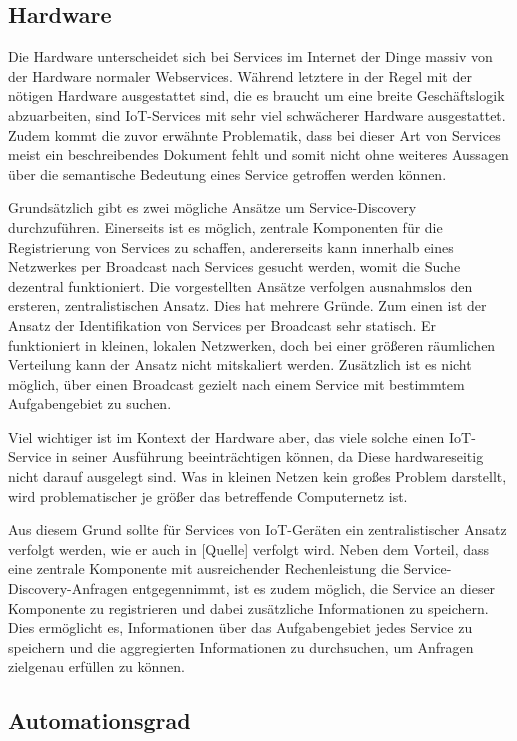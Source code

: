 \documentclass[conference,compsoc]{IEEEtran}
\begin{document}
\subsection{Hardware} \label{Hardware}

Die Hardware unterscheidet sich bei Services im Internet der Dinge massiv von der Hardware normaler Webservices. Während letztere in der Regel mit der nötigen Hardware ausgestattet sind, die es braucht um eine breite Geschäftslogik abzuarbeiten, sind IoT-Services mit sehr viel schwächerer Hardware ausgestattet. Zudem kommt die zuvor erwähnte Problematik, dass bei dieser Art von Services meist ein beschreibendes Dokument fehlt und somit nicht ohne weiteres Aussagen über die semantische Bedeutung eines Service getroffen werden können.

Grundsätzlich gibt es zwei mögliche Ansätze um Service-Discovery durchzuführen. Einerseits ist es möglich, zentrale Komponenten für die Registrierung von Services zu schaffen, andererseits kann innerhalb eines Netzwerkes per Broadcast nach Services gesucht werden, womit die Suche dezentral funktioniert. Die vorgestellten Ansätze verfolgen ausnahmslos den ersteren, zentralistischen Ansatz. Dies hat mehrere Gründe. Zum einen ist der Ansatz der Identifikation von Services per Broadcast sehr statisch. Er funktioniert in kleinen, lokalen Netzwerken, doch bei einer größeren räumlichen Verteilung kann der Ansatz nicht mitskaliert werden. Zusätzlich ist es nicht möglich, über einen Broadcast gezielt nach einem Service mit bestimmtem Aufgabengebiet zu suchen.

Viel wichtiger ist im Kontext der Hardware aber, das viele solche einen IoT-Service in seiner Ausführung beeinträchtigen können, da Diese hardwareseitig nicht darauf ausgelegt sind. Was in kleinen Netzen kein großes Problem darstellt, wird problematischer je größer das betreffende Computernetz ist. 

Aus diesem Grund sollte für Services von IoT-Geräten ein zentralistischer Ansatz verfolgt werden, wie er auch in [Quelle] verfolgt wird. Neben dem Vorteil, dass eine zentrale Komponente mit ausreichender Rechenleistung die Service-Discovery-Anfragen entgegennimmt, ist es zudem möglich, die Service an dieser Komponente zu registrieren und dabei zusätzliche Informationen zu speichern. Dies ermöglicht es, Informationen über das Aufgabengebiet jedes Service zu speichern und die aggregierten Informationen zu durchsuchen, um Anfragen zielgenau erfüllen zu können. 


\subsection{Automationsgrad}
\end{document}
